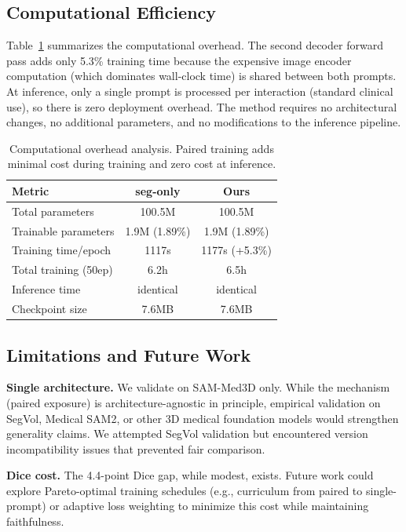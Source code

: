 \subsection{Computational Efficiency}

Table~\ref{tab:overhead} summarizes the computational overhead. The second decoder forward pass adds only 5.3\% training time because the expensive image encoder computation (which dominates wall-clock time) is shared between both prompts. At inference, only a single prompt is processed per interaction (standard clinical use), so there is zero deployment overhead. The method requires no architectural changes, no additional parameters, and no modifications to the inference pipeline.

\begin{table}[t]
\centering
\small
\caption{Computational overhead analysis. Paired training adds minimal cost during training and zero cost at inference.}
\label{tab:overhead}
\begin{tabular}{lcc}
\toprule
\textbf{Metric} & \textbf{seg-only} & \textbf{Ours} \\
\midrule
Total parameters & 100.5M & 100.5M \\
Trainable parameters & 1.9M (1.89\%) & 1.9M (1.89\%) \\
Training time/epoch & 1117s & 1177s (+5.3\%) \\
Total training (50ep) & 6.2h & 6.5h \\
Inference time & identical & identical \\
Checkpoint size & 7.6MB & 7.6MB \\
\bottomrule
\end{tabular}
\end{table}

\subsection{Limitations and Future Work}

\textbf{Single architecture.} We validate on SAM-Med3D only. While the mechanism (paired exposure) is architecture-agnostic in principle, empirical validation on SegVol, Medical SAM2, or other 3D medical foundation models would strengthen generality claims. We attempted SegVol validation but encountered version incompatibility issues that prevented fair comparison.

\textbf{Dice cost.} The 4.4-point Dice gap, while modest, exists. Future work could explore Pareto-optimal training schedules (e.g., curriculum from paired to single-prompt) or adaptive loss weighting to minimize this cost while maintaining faithfulness.

